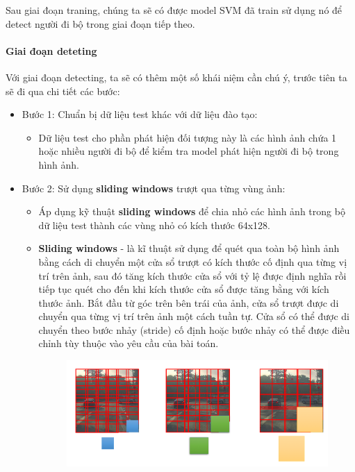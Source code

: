Sau giai đoạn traning, chúng ta sẽ có được model SVM đã train sử dụng nó để detect người đi bộ trong giai đoạn tiếp theo.
\paragraph{Giai đoạn deteting\\}
Với giai đoạn detecting, ta sẽ có thêm một số khái niệm cần chú ý, trước tiên ta sẽ đi qua chi tiết các bước:
\begin{itemize}[noitemsep, topsep=0pt, leftmargin=1.25em ]
    \item Bước 1: Chuẩn bị dữ liệu test khác với dữ liệu đào tạo:
    \begin{itemize}[noitemsep, topsep=0pt, leftmargin=1.5em, label={$-$}]
        \item Dữ liệu test cho phần phát hiện đối tượng này là các hình ảnh chứa 1 hoặc nhiều người đi bộ để kiểm tra model phát hiện người đi bộ trong hình ảnh.
    \end{itemize}
    \item Bước 2: Sử dụng \textbf{sliding windows} trượt qua từng vùng ảnh:
        \begin{itemize}[noitemsep, topsep=0pt, leftmargin=1.5em, label={$-$}]
            \item Áp dụng kỹ thuật \textbf{sliding windows} để chia nhỏ các hình ảnh trong bộ dữ liệu test thành các vùng nhỏ có kích thước 64x128.
            \item \textbf{Sliding windows} - là kĩ thuật sử dụng để quét qua toàn bộ hình ảnh bằng cách di chuyển một cửa sổ trượt có kích thước cố định qua từng vị trí trên ảnh, sau đó tăng kích thước cửa sổ với tỷ lệ được định nghĩa rồi tiếp tục quét cho đến khi kích thước cửa sổ được tăng bằng với kích thước ảnh. Bắt đầu từ góc trên bên trái của ảnh, cửa sổ trượt được di chuyển qua từng vị trí trên ảnh một cách tuần tự. Cửa sổ có thể được di chuyển theo bước nhảy (stride) cố định hoặc bước nhảy có thể được điều chỉnh tùy thuộc vào yêu cầu của bài toán.
            \graphicspath{{figures/}}
                \begin{figure}[h!]
                  \centering
                  \includegraphics[scale=0.35]{graphics/slidingw.png}

\end{figure}
\end{itemize}
\end{itemize}
